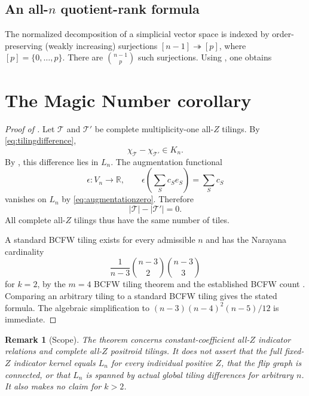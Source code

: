\documentclass[11pt]{article}
\newtheorem{corollary}[theorem]{Corollary}
\newtheorem{remark}[theorem]{Remark}
\newcommand{\U}{\mathcal U}
\newcommand{\R}{\mathbb R}
\newcommand{\1}{\mathbf 1}
\newcommand{\rank}{\operatorname{rank}}
\begin{document}
\subsection{An all-\texorpdfstring{$n$}{n} quotient-rank formula}
The normalized decomposition of a simplicial vector space is indexed by
order-preserving (weakly increasing) surjections $[n-1]\twoheadrightarrow[p]$,
where $[p]=\{0,\dots,p\}$.  There are $\binom{n-1}{p}$ such surjections.
Using , one obtains

\section{The Magic Number corollary}
\label{sec:magic}

\begin{proof}[Proof of ]
Let $\mathcal T$ and $\mathcal T'$ be complete multiplicity-one all-$Z$
tilings.  By \eqref{eq:tilingdifference},
\[
\chi_{\mathcal T}-\chi_{\mathcal T'}\in K_n.
\]
By , this difference lies in $L_n$.  The augmentation
functional
\[
\epsilon:V_n\to\R,\qquad
\epsilon\!\left(\sum_S c_Se_S\right)=\sum_S c_S
\]
vanishes on $L_n$ by \eqref{eq:augmentationzero}.  Therefore
\[
|\mathcal T|-|\mathcal T'|=0.
\]
All complete all-$Z$ tilings thus have the same number of tiles.

A standard BCFW tiling exists for every admissible $n$ and has the Narayana
cardinality
\[
\frac{1}{n-3}\binom{n-3}{2}\binom{n-3}{3}
\]
for $k=2$, by the $m=4$ BCFW tiling theorem and the established BCFW count
\cite{KWZ,BCFWCluster}.  Comparing an arbitrary tiling to a standard BCFW
tiling gives the stated formula.  The algebraic simplification to
$(n-3)(n-4)^2(n-5)/12$ is immediate.
\end{proof}

\begin{remark}[Scope]
The theorem concerns constant-coefficient all-$Z$ indicator relations and
complete all-$Z$ positroid tilings.  It does not assert that the full
fixed-$Z$ indicator kernel equals $L_n$ for every individual positive
$Z$, that the flip graph is connected, or that $L_n$ is spanned by actual
global tiling differences for arbitrary $n$.  It also makes no claim for
$k>2$.
\end{remark}
\end{document}
